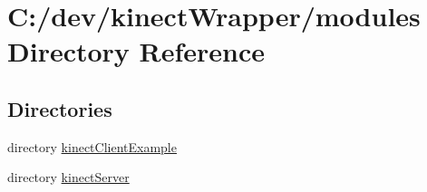 \section{C\+:/dev/kinect\+Wrapper/modules Directory Reference}
\label{dir_e05d7e2b1ecd646af5bb94391405f3b5}
\subsection*{Directories}
\begin{DoxyCompactItemize}
\item 
directory \hyperlink{dir_315e5efb410a16c3dc704eab1dfa1351}{kinect\+Client\+Example}
\item 
directory \hyperlink{dir_65d72078f2cb6a873d9d899efb0a00ca}{kinect\+Server}
\end{DoxyCompactItemize}

